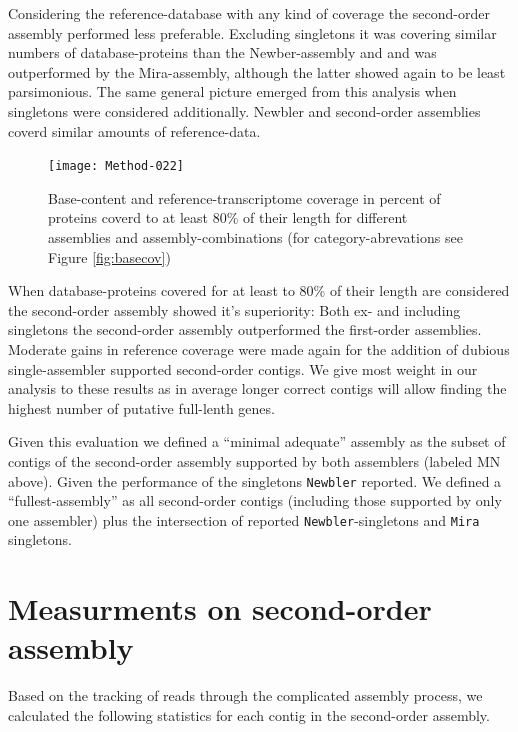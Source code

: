 \documentclass[12pt,a4paper]{article}
\begin{document}
Considering the reference-database with any kind of coverage the
second-order assembly performed less preferable. Excluding singletons
it was covering similar numbers of database-proteins than the
Newber-assembly and and was outperformed by the Mira-assembly,
although the latter showed again to be least parsimonious. The same
general picture emerged from this analysis when singletons were
considered additionally. Newbler and second-order assemblies coverd
similar amounts of reference-data.

\begin{figure}[H]

\texttt{[image: Method-022]}
\caption{Base-content and reference-transcriptome coverage in percent
  of proteins coverd to at least 80\% of their length for different
  assemblies and assembly-combinations (for category-abrevations see
  Figure \ref{fig:basecov})}
\label{fig:prot80cov}
\end{figure}

When database-proteins covered for at least to 80\% of their length
are considered the second-order assembly showed it's superiority: Both
ex- and including singletons the second-order assembly outperformed
the first-order assemblies. Moderate gains in reference coverage were
made again for the addition of dubious single-assembler supported
second-order contigs. We give most weight in our analysis to these
results as in average longer correct contigs will allow finding the
highest number of putative full-lenth genes.

Given this evaluation we defined a ``minimal adequate'' assembly as the
subset of contigs of the second-order assembly supported by both
assemblers (labeled MN above). Given the performance of the singletons
\texttt{Newbler} reported. We defined a ``fullest-assembly'' as all
second-order contigs (including those supported by only one assembler)
plus the intersection of reported \texttt{Newbler}-singletons and
\texttt{Mira} singletons.

\section{Measurments on second-order assembly}

Based on the tracking of reads through the complicated assembly
process, we calculated the following statistics for each contig in the
second-order assembly.
\end{document}
